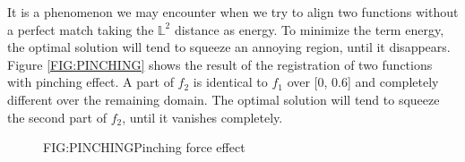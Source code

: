 
It is a phenomenon we may encounter when we try to align two functions without a
perfect match taking the $\mathbb{L}^2$ distance as energy. To minimize the term
energy, the optimal solution will tend to
squeeze an annoying region, until it disappears. Figure \ref{FIG:PINCHING}
shows the result of the registration of two functions with pinching effect.
A part of $f_2$ is identical to $f_1$ over [0, 0.6] and completely different
over the remaining domain. The optimal solution will tend to squeeze the second
part of $f_2$, until it vanishes completely.

\begin{figure}[Pinching force effect]{FIG:PINCHING}{Pinching force effect}
	 \quad
\end{figure}